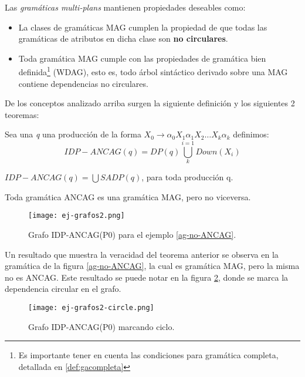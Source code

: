 Las \textit{gramáticas multi-plans} mantienen propiedades deseables como:
\begin{itemize}
\item La clases de gramáticas MAG cumplen la propiedad de que todas las gramáticas de atributos en dicha clase son \textbf{no circulares}.
\item Toda gramática MAG cumple con las propiedades de gramática bien definida\footnote{Es importante tener en cuenta las condiciones para gramática completa, detallada en \ref{def:gacompleta}} (WDAG), esto es, todo árbol sintáctico derivado sobre una MAG contiene dependencias no circulares.
\end{itemize}


De los conceptos analizado arriba surgen la siguiente definición y los siguientes 2 teoremas:

\begin{definition}
\label{def:ancag}
 Sea una \textit{q} una producción de la forma $X_{0}\rightarrow \alpha_{0} X_{1} \alpha_{1} X_{2} \dots X_{k} \alpha_{k}$ definimos:
\begin{equation}
 IDP-ANCAG(q) = DP(q) \bigcup\limits_{k}^{i=1}{Down(X_{i})}
\end{equation}

\end{definition}

\begin{theorem}
\label{th:ancag1}
$IDP-ANCAG(q) = \bigcup SADP(q)$, para toda producción q. 
\end{theorem}

\begin{theorem}
\label{th:ancag2}
Toda gramática ANCAG es una gramática MAG, pero no viceversa.
\end{theorem}

\begin{figure}\centering
\texttt{[image: ej-grafos2.png]}
\caption{\label{idp-wuu-yang}Grafo IDP-ANCAG(P0) para el ejemplo \ref{ag-no-ANCAG}.}
\end{figure}

Un resultado que muestra la veracidad del teorema anterior se observa en la gramática de la figura \ref{ag-no-ANCAG}, la cual es gramática MAG, pero la misma no es ANCAG. Este resultado se puede notar en la figura \ref{ancag-circle}, donde se marca la dependencia circular en el grafo.

\begin{figure}[!ht]\centering
\texttt{[image: ej-grafos2-circle.png]}
\caption{\label{ancag-circle} Grafo IDP-ANCAG(P0) marcando ciclo.}
\end{figure}
